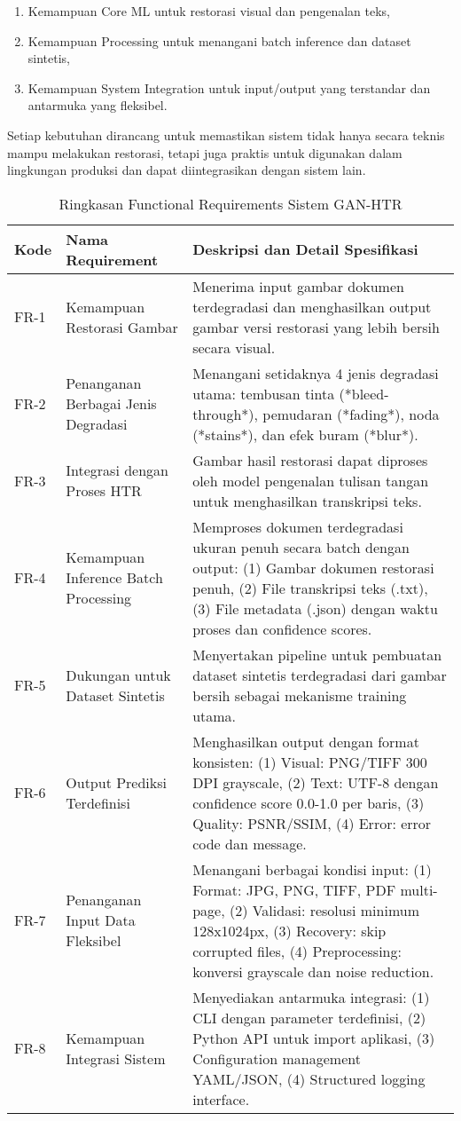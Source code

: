 \documentclass[12pt,a4paper]{article}
\begin{document}
\begin{enumerate}
    \item Kemampuan Core ML untuk restorasi visual dan pengenalan teks,
    \item Kemampuan Processing untuk menangani batch inference dan dataset sintetis,
    \item Kemampuan System Integration untuk input/output yang terstandar dan antarmuka yang fleksibel.
\end{enumerate}
Setiap kebutuhan dirancang untuk memastikan sistem tidak hanya secara teknis mampu melakukan restorasi, tetapi juga praktis untuk digunakan dalam lingkungan produksi dan dapat diintegrasikan dengan sistem lain.

\begin{table}[htbp!]
\centering
\caption{Ringkasan Functional Requirements Sistem GAN-HTR}
\label{tab:functional_requirements}
\begin{tabular}{p{}p{}p{}}
\toprule
\textbf{Kode} & \textbf{Nama Requirement} & \textbf{Deskripsi dan Detail Spesifikasi} \\
\midrule
FR-1 & Kemampuan Restorasi Gambar & Menerima input gambar dokumen terdegradasi dan menghasilkan output gambar versi restorasi yang lebih bersih secara visual. \\
\midrule
FR-2 & Penanganan Berbagai Jenis Degradasi & Menangani setidaknya 4 jenis degradasi utama: tembusan tinta (*bleed-through*), pemudaran (*fading*), noda (*stains*), dan efek buram (*blur*). \\
\midrule
FR-3 & Integrasi dengan Proses HTR & Gambar hasil restorasi dapat diproses oleh model pengenalan tulisan tangan untuk menghasilkan transkripsi teks. \\
\midrule
FR-4 & Kemampuan Inference Batch Processing & Memproses dokumen terdegradasi ukuran penuh secara batch dengan output: (1) Gambar dokumen restorasi penuh, (2) File transkripsi teks (.txt), (3) File metadata (.json) dengan waktu proses dan confidence scores. \\
\midrule
FR-5 & Dukungan untuk Dataset Sintetis & Menyertakan pipeline untuk pembuatan dataset sintetis terdegradasi dari gambar bersih sebagai mekanisme training utama. \\
\midrule
FR-6 & Output Prediksi Terdefinisi & Menghasilkan output dengan format konsisten: (1) Visual: PNG/TIFF 300 DPI grayscale, (2) Text: UTF-8 dengan confidence score 0.0-1.0 per baris, (3) Quality: PSNR/SSIM, (4) Error: error code dan message. \\
\midrule
FR-7 & Penanganan Input Data Fleksibel & Menangani berbagai kondisi input: (1) Format: JPG, PNG, TIFF, PDF multi-page, (2) Validasi: resolusi minimum 128x1024px, (3) Recovery: skip corrupted files, (4) Preprocessing: konversi grayscale dan noise reduction. \\
\midrule
FR-8 & Kemampuan Integrasi Sistem & Menyediakan antarmuka integrasi: (1) CLI dengan parameter terdefinisi, (2) Python API untuk import aplikasi, (3) Configuration management YAML/JSON, (4) Structured logging interface. \\
\bottomrule
\end{tabular}
\end{table}
\end{document}

